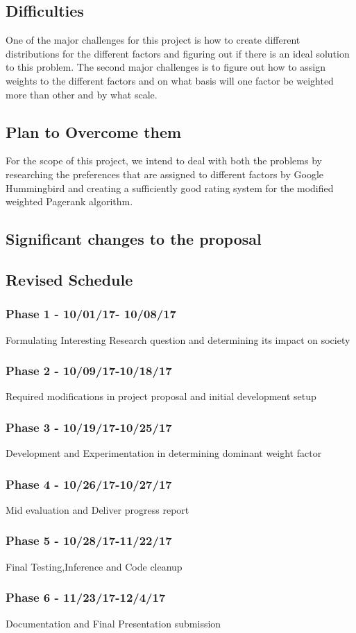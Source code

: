 \documentclass[conference]{IEEEtran}
\begin{document}
\subsection{Difficulties}
One of the major challenges for this project is how to create different distributions for the different factors and figuring out if there is an ideal solution to this problem.
The second major challenges is to figure out how to assign weights to the different factors and on what basis will one factor be weighted more than other and by what scale.


\subsection{Plan to Overcome them}
For the scope of this project, we intend to deal with both the problems by researching the preferences that are assigned to different factors by Google Hummingbird and creating a sufficiently good rating system for the modified weighted Pagerank algorithm.

\subsection{Significant changes to the proposal}

\subsection{Revised Schedule}

\subsubsection{Phase 1 - 10/01/17- 10/08/17}
Formulating Interesting Research question and determining its impact on society	

\subsubsection{Phase 2 - 10/09/17-10/18/17}

Required modifications in project  proposal and initial development setup

\subsubsection{Phase 3 - 10/19/17-10/25/17}
Development and Experimentation in determining dominant weight factor   

\subsubsection{Phase 4 - 10/26/17-10/27/17}
Mid evaluation and Deliver  progress report							  

\subsubsection{Phase 5 - 10/28/17-11/22/17}
Final Testing,Inference and Code cleanup

\subsubsection{Phase 6 - 11/23/17-12/4/17}
Documentation and Final Presentation submission
\end{document}

